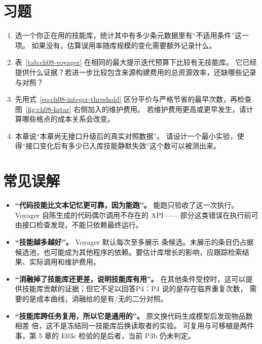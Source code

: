 \section*{习题}
\begin{enumerate}[label=8-\arabic*.,ref=8-\arabic*]
  \item\label{ex:ch08-1} 选一个你正在用的技能库，统计其中有多少条元数据里有``不适用条件''这一项。
        如果没有，估算误用率随库规模的变化需要额外记录什么。
  \item\label{ex:ch08-2} 表~\ref{tab:ch08-voyager} 在相同的最大提示迭代预算下比较有无技能库。
        它已经提供什么证据？若进一步比较包含来源构建费用的总资源效率，还缺哪些记录与对照？
  \item\label{ex:ch08-3} 先用式~\ref{eq:ch08-integer-threshold} 区分平价与严格节省的最早次数，再检查图~\ref{fig:ch08-kstar} 右侧加入的维护费用。
        若维护费用更高或更早发生，请计算哪些格点的成本关系会改变。
  \item\label{ex:ch08-4} 本章说``本章尚无接口升级后的真实对照数据''。
        请设计一个最小实验，使得``接口变化后有多少已入库技能静默失效''这个数可以被测出来。
\end{enumerate}

\section*{常见误解}
\begin{itemize}
  \item \textbf{``代码技能比文本记忆更可靠，因为能跑''。}
        能跑只验收了这一次执行。Voyager 自陈生成的代码偶尔调用不存在的 API\cite{voyager-2305}——
        部分这类错误在执行前可由接口检查发现，不能只依赖最终运行。
  \item \textbf{``技能越多越好''。}
        Voyager 默认每次至多展示  条候选\cite{voyager-2305,voyager-code-55e45a8}。未展示的条目仍占据候选池，也可能成为其他程序的依赖。要估计库增长的影响，应跟踪检索结果、实际调用和维护费用。
  \item \textbf{``消融掉了技能库还更差，说明技能库有用''。}
        在其他条件受控时，这可以提供技能库贡献的证据；但它不足以回答P4：P4 说的是存在临界重复次数，
        需要的是成本曲线，消融给的是有/无的二分对照。
  \item \textbf{``技能库跨任务复用，所以它是通用的''。}
        原文换代码生成模型后发现物品数相差  倍，这不是冻结同一技能库后换读取者的实验\cite{voyager-2305}。
        可复用与可移植是两件事，第 5 章的 E03c 检验的是后者，当前 P3b 仍未判定。
\end{itemize}

